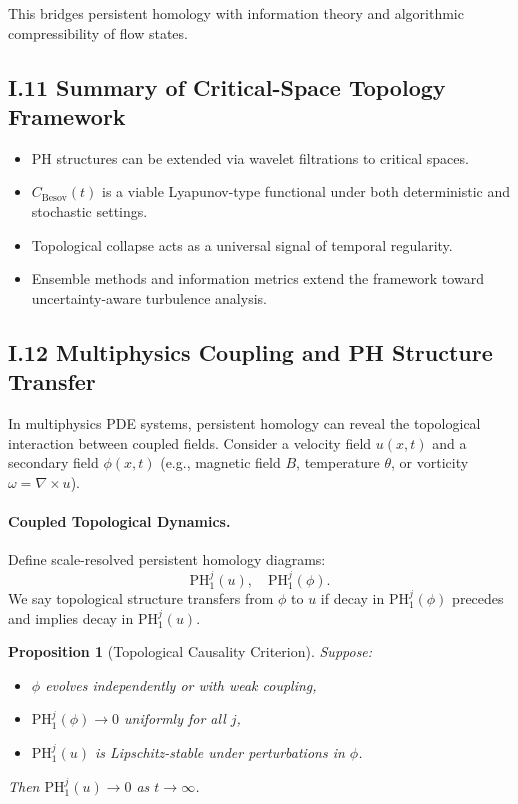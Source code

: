 \documentclass[11pt]{article}
\newtheorem{proposition}[theorem]{Proposition}
\theoremstyle{definition}
\begin{document}
This bridges persistent homology with information theory and algorithmic compressibility of flow states.

\subsection*{I.11 Summary of Critical-Space Topology Framework}

\begin{itemize}
  \item PH structures can be extended via wavelet filtrations to critical spaces.
  \item $C_{\text{Besov}}(t)$ is a viable Lyapunov-type functional under both deterministic and stochastic settings.
  \item Topological collapse acts as a universal signal of temporal regularity.
  \item Ensemble methods and information metrics extend the framework toward uncertainty-aware turbulence analysis.
\end{itemize}

\subsection*{I.12 Multiphysics Coupling and PH Structure Transfer}

In multiphysics PDE systems, persistent homology can reveal the topological interaction between coupled fields.
Consider a velocity field $u(x,t)$ and a secondary field $\phi(x,t)$ (e.g., magnetic field $B$, temperature $\theta$, or vorticity $\omega = \nabla \times u$).

\paragraph{Coupled Topological Dynamics.}
Define scale-resolved persistent homology diagrams:
\[
\mathrm{PH}_1^j(u), \quad \mathrm{PH}_1^j(\phi).
\]
We say topological structure transfers from $\phi$ to $u$ if decay in $\mathrm{PH}_1^j(\phi)$ precedes and implies decay in $\mathrm{PH}_1^j(u)$.

\begin{proposition}[Topological Causality Criterion]
Suppose:
\begin{itemize}
  \item $\phi$ evolves independently or with weak coupling,
  \item $\mathrm{PH}_1^j(\phi) \to 0$ uniformly for all $j$,
  \item $\mathrm{PH}_1^j(u)$ is Lipschitz-stable under perturbations in $\phi$.
\end{itemize}
Then $\mathrm{PH}_1^j(u) \to 0$ as $t \to \infty$.
\end{proposition}
\end{document}
